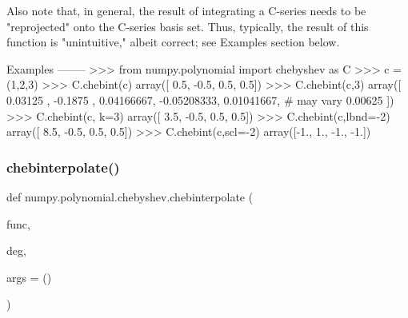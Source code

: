 \begin{DoxyVerb}
Also note that, in general, the result of integrating a C-series needs
to be "reprojected" onto the C-series basis set.  Thus, typically,
the result of this function is "unintuitive," albeit correct; see
Examples section below.

Examples
--------
>>> from numpy.polynomial import chebyshev as C
>>> c = (1,2,3)
>>> C.chebint(c)
array([ 0.5, -0.5,  0.5,  0.5])
>>> C.chebint(c,3)
array([ 0.03125   , -0.1875    ,  0.04166667, -0.05208333,  0.01041667, # may vary
    0.00625   ])
>>> C.chebint(c, k=3)
array([ 3.5, -0.5,  0.5,  0.5])
>>> C.chebint(c,lbnd=-2)
array([ 8.5, -0.5,  0.5,  0.5])
>>> C.chebint(c,scl=-2)
array([-1.,  1., -1., -1.])\end{DoxyVerb}
 \mbox{\label{namespacenumpy_1_1polynomial_1_1chebyshev_a33e9bef786d32c0eef893c68dd34fa09}} 
\subsubsection{\texorpdfstring{chebinterpolate()}{chebinterpolate()}}
{\footnotesize\ttfamily def numpy.\+polynomial.\+chebyshev.\+chebinterpolate (\begin{DoxyParamCaption}\item[{}]{func,  }\item[{}]{deg,  }\item[{}]{args = {\ttfamily ()} }\end{DoxyParamCaption})}

